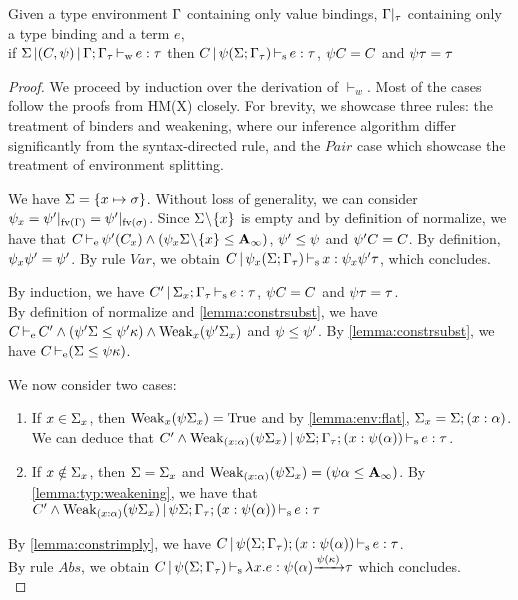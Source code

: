 \begin{theorem}
  Given a type environment $\Gamma$ containing only value bindings,
  $\Gamma|_\tau$ containing only a type binding and a term $e$,\\
  if $\Sigma \operatorname{|} (C,\mathrm{\psi}) \operatorname{|} \Gamma;\Gamma_\tau \operatorname{\vdash_w} e : \tau$
  then $C \operatorname{|} \mathrm{\psi}(\Sigma;\Gamma_\tau) \operatorname{\vdash_s} e : \tau$, $\mathrm{\psi} C = C$ and $\mathrm{\psi} \tau = \tau$
\begin{proof}
  We proceed by induction over the derivation of $\vdash_w$.
  Most of the cases follow the proofs from HM(X) closely.
  For brevity, we showcase three rules: the treatment of binders
  and weakening, where our inference algorithm differ significantly
  from the syntax-directed rule, and the $Pair$ case
  which showcase the treatment of environment splitting.


  We have $\Sigma = \left\{x \mapsto \sigma\right\}$.
  Without loss of generality, we can consider $\mathrm{\psi}_x = \mathrm{\psi}'|_{\operatorname{fv}(\Gamma)} = \mathrm{\psi}'|_{\operatorname{fv}(\sigma)}$.
  Since $\Sigma\!\setminus\!\{x\}$ is empty and by definition of normalize, we
  have that
  $C \operatorname{\vdash_e} \mathrm{\psi}'(C_x) \wedge (\mathrm{\psi}_x\Sigma\!\setminus\!\{x\} \leq \mathbf{A}_\infty)$,
  $\mathrm{\psi}' \leq \mathrm{\psi}$ and $\mathrm{\psi}'C = C$.
  By definition, $\mathrm{\psi}_x\mathrm{\psi}' = \mathrm{\psi}'$.
  By rule $Var$, we obtain
  $C \operatorname{|} \mathrm{\psi}_x(\Sigma;\Gamma_\tau) \operatorname{\vdash_s} x : \mathrm{\psi}_x\mathrm{\psi}'\tau$, which concludes.
  \\


  By induction, we have
  $C' \operatorname{|} \Sigma_x;\Gamma_\tau \operatorname{\vdash_s} e : \tau$, $\mathrm{\psi} C = C$
  and $\mathrm{\psi} \tau = \tau$.\\
  By definition of normalize and \cref{lemma:constrsubst}, we have
  $C \operatorname{\vdash_e} C'\wedge(\mathrm{\psi}'\Sigma \leq \mathrm{\psi}'\kappa) \wedge \operatorname{Weak}_{x}(\mathrm{\psi}'\Sigma_x)$ and
  $\mathrm{\psi} \leq \mathrm{\psi}'$.
  By \cref{lemma:constrsubst}, we have $C \operatorname{\vdash_e} (\Sigma \leq \mathrm{\psi}\kappa)$.

  We now consider two cases:
  \begin{enumerate}[leftmargin=*,noitemsep,topsep=5pt]
  \item If $x\in\Sigma_x$, then $\operatorname{Weak}_{x}(\mathrm{\psi}\Sigma_x) = \operatorname{True}$
    and by \cref{lemma:env:flat}, $\Sigma_x = \Sigma;(x : \alpha)$.
    We can deduce that
    $C'\wedge \operatorname{Weak}_{(x : \alpha)}(\mathrm{\psi}\Sigma_x) \operatorname{|} \mathrm{\psi}\Sigma;\Gamma_\tau;(x : \mathrm{\psi}(\alpha)) \operatorname{\vdash_s} e : \tau$.
  \item If $x\notin\Sigma_x$, then $\Sigma = \Sigma_x$ and
    $\operatorname{Weak}_{(x : \alpha)}(\mathrm{\psi}\Sigma_x) = (\mathrm{\psi}\alpha \leq \mathbf{A}_\infty)$.
    By \cref{lemma:typ:weakening},
    we have that
    $C'\wedge \operatorname{Weak}_{(x : \alpha)}(\mathrm{\psi}\Sigma_x) \operatorname{|} \mathrm{\psi}\Sigma;\Gamma_\tau;(x : \mathrm{\psi}(\alpha)) \operatorname{\vdash_s} e : \tau$
  \end{enumerate}
  By \cref{lemma:constrimply}, we
  have $C \operatorname{|} \mathrm{\psi}(\Sigma;\Gamma_\tau);(x : \mathrm{\psi}(\alpha)) \operatorname{\vdash_s} e : \tau$.\\
  By rule $Abs$, we obtain
  $C \operatorname{|} \mathrm{\psi}(\Sigma;\Gamma_\tau) \operatorname{\vdash_s} \lambda^{{}} x.{e} : \mathrm{\psi}(\alpha){\xrightarrow{\mathrm{\psi}(\kappa)}}\tau$ which concludes.
  \\


\end{proof}
\end{theorem}
